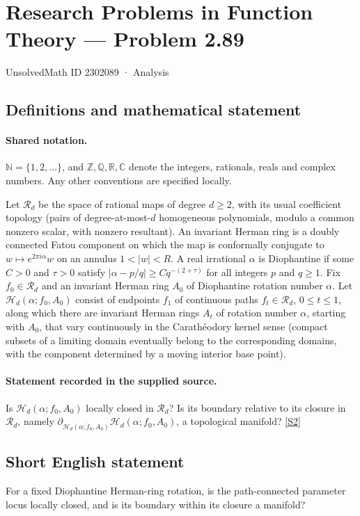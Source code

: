 \documentclass[11pt]{article}
\newcommand{\sref}[2]{\hyperlink{source:#1:#2}{[S#2]}}
\begin{document}
\setcounter{section}{2302088}
\section{Research Problems in Function Theory — Problem 2.89}\label{2302089}
{\small\sffamily UnsolvedMath ID 2302089 · Analysis}
\subsection{Definitions and mathematical statement}

\paragraph{Shared notation.}$\mathbb N=\{1,2,\ldots\}$, and $\mathbb Z,\mathbb Q,\mathbb R,\mathbb C$ denote the integers, rationals, reals and complex numbers. Any other conventions are specified locally.


Let $\mathcal R_d$ be the space of rational maps of degree $d\geq2$, with its usual coefficient topology (pairs of degree-at-most-$d$ homogeneous polynomials, modulo a common nonzero scalar, with nonzero resultant). An invariant Herman ring is a doubly connected Fatou component on which the map is conformally conjugate to $w\mapsto e^{2\pi i\alpha}w$ on an annulus $1<|w|<R$. A real irrational $\alpha$ is Diophantine if some $C>0$ and $\tau>0$ satisfy $|\alpha-p/q|\geq Cq^{-(2+\tau)}$ for all integers $p$ and $q\geq1$.
Fix $f_0\in\mathcal R_d$ and an invariant Herman ring $A_0$ of Diophantine rotation number $\alpha$. Let $\mathcal H_d(\alpha;f_0,A_0)$ consist of endpoints $f_1$ of continuous paths $f_t\in\mathcal R_d$, $0\leq t\leq1$, along which there are invariant Herman rings $A_t$ of rotation number $\alpha$, starting with $A_0$, that vary continuously in the Carath\'eodory kernel sense (compact subsets of a limiting domain eventually belong to the corresponding domains, with the component determined by a moving interior base point).
\paragraph{Statement recorded in the supplied source.}
Is $\mathcal H_d(\alpha;f_0,A_0)$ locally closed in $\mathcal R_d$? Is its boundary relative to its closure in $\mathcal R_d$, namely $\partial_{\overline{\mathcal H_d(\alpha;f_0,A_0)}}\mathcal H_d(\alpha;f_0,A_0)$, a topological manifold? \sref{2302089}{2}
\subsection{Short English statement}
For a fixed Diophantine Herman-ring rotation, is the path-connected parameter locus locally closed, and is its boundary within its closure a manifold?
\end{document}
